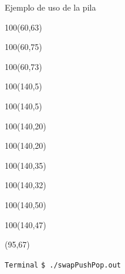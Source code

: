 \documentclass[aspectratio=169]{beamer}
\begin{document}
\begin{frame}[fragile]{Ejemplo de uso de la pila}
    \begin{textblock}{100}(60,63)   \end{textblock}
    \begin{textblock}{100}(60,75)   \end{textblock}
    \begin{textblock}{100}(60,73)   \end{textblock}
    \begin{textblock}{100}(140,5)   \end{textblock}
    \begin{textblock}{100}(140,5)   \end{textblock}
    \begin{textblock}{100}(140,20)   \end{textblock}
    \begin{textblock}{100}(140,20)   \end{textblock}
    \begin{textblock}{100}(140,35)   \end{textblock}
    \begin{textblock}{100}(140,32)   \end{textblock}
    \begin{textblock}{100}(140,50)   \end{textblock}
    \begin{textblock}{100}(140,47)   \end{textblock}
    \begin{textblock}{50}(95,67) 
    \begin{block}{\scriptsize \texttt{Terminal}}
    \scriptsize
    \texttt{\$ ./swapPushPop.out}\\
    \end{block}
    \end{textblock}
\end{frame}
\end{document}
